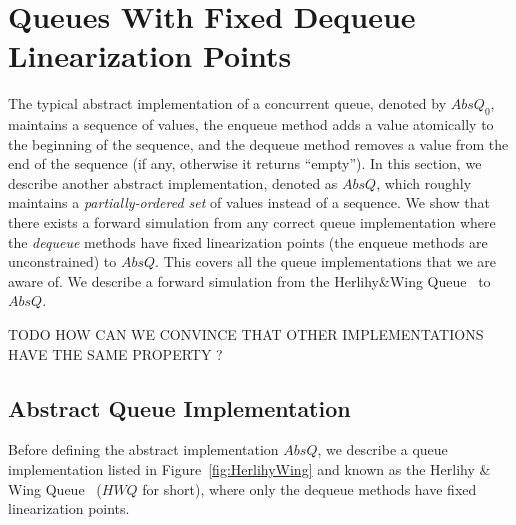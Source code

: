 \section{Queues With Fixed Dequeue Linearization Points}\label{sec:queues}

The typical abstract implementation of a concurrent queue, denoted by $AbsQ_0$, maintains a sequence of values, the enqueue method adds a value atomically to the beginning of the sequence, and the dequeue method removes a value from the end of the sequence (if any, otherwise it returns ``empty''). In this section, we describe another abstract implementation, denoted as $AbsQ$, which roughly maintains a \emph{partially-ordered set} of values instead of a sequence. We show that there exists a forward simulation from any correct queue implementation where the \emph{dequeue} methods have fixed linearization points (the enqueue methods are unconstrained) to $AbsQ$. This covers all the queue implementations that we are aware of. We describe a forward simulation from the Herlihy\&Wing Queue~\cite{journals/toplas/HerlihyW90} to $AbsQ$.

TODO HOW CAN WE CONVINCE THAT OTHER IMPLEMENTATIONS HAVE THE SAME PROPERTY ?

\subsection{Abstract Queue Implementation}

Before defining the abstract implementation $AbsQ$, we describe a queue implementation listed in Figure~\ref{fig:HerlihyWing} and known as the Herlihy \& Wing Queue~\cite{journals/toplas/HerlihyW90} ($\mathit{HWQ}$ for short), 
where only the dequeue methods have fixed linearization points. 

